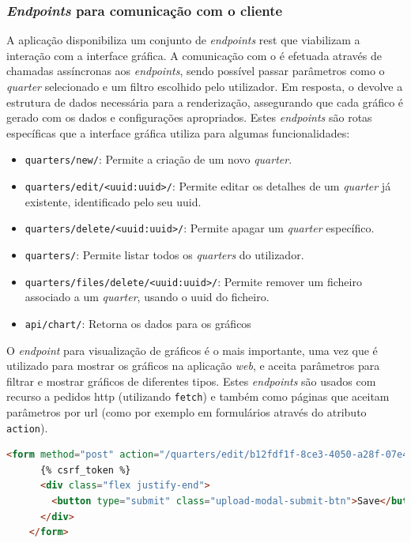 \subsubsection{\textit{Endpoints} para comunicação com o cliente}

A aplicação disponibiliza um conjunto de \textit{endpoints} \gls{rest} que viabilizam a interação com a interface gráfica. A comunicação com o  é efetuada através de chamadas assíncronas aos \textit{endpoints}, sendo possível passar parâmetros como o \textit{quarter} selecionado e um filtro escolhido pelo utilizador. Em resposta, o  devolve a estrutura de dados necessária para a renderização, assegurando que cada gráfico é gerado com os dados e configurações apropriados. Estes \textit{endpoints} são rotas específicas que a interface gráfica utiliza para algumas funcionalidades:

\begin{itemize}
    \item \texttt{quarters/new/}: Permite a criação de um novo \textit{quarter}.
    \item \texttt{quarters/edit/<uuid:uuid>/}: Permite editar os detalhes de um \textit{quarter} já existente, identificado pelo seu \gls{uuid}.
    \item \texttt{quarters/delete/<uuid:uuid>/}: Permite apagar um \textit{quarter} específico.
    \item \texttt{quarters/}: Permite listar todos os \textit{quarters} do utilizador.
    \item \texttt{quarters/files/delete/<uuid:uuid>/}: Permite remover um ficheiro associado a um \textit{quarter}, usando o \gls{uuid} do ficheiro.
    \item \texttt{api/chart/}: Retorna os dados para os gráficos
  \end{itemize}
  
O \textit{endpoint} para visualização de gráficos é o mais importante, uma vez que é utilizado para mostrar os gráficos na aplicação \textit{web}, e aceita parâmetros para filtrar e mostrar gráficos de diferentes tipos. Estes \textit{endpoints} são usados com recurso a pedidos \gls{http} (utilizando \texttt{fetch}) e também como páginas que aceitam parâmetros por \gls{url} (como por exemplo em formulários através do atributo \texttt{action}).


\begin{lstlisting}[language=HTML, caption={Excerto do código \gls{html} do formulário de edição de \textit{quarter} }]
    <form method="post" action="/quarters/edit/b12fdf1f-8ce3-4050-a28f-07e444e15042/" id="edit-quarter-form" class="upload-form-wrapper" enctype="multipart/form-data">
      {% csrf_token %}
      <div class="flex justify-end">
        <button type="submit" class="upload-modal-submit-btn">Save</button>
      </div>
    </form>
    \end{lstlisting}

